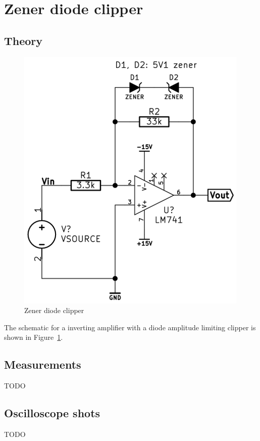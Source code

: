 \documentclass[11pt,a4paper]{article}
\begin{document}
\section{Zener diode clipper}\label{zener-clipper}

\subsection{Theory}\label{clipper-theory}
\begin{figure}[htbp]
    \centering
        \includegraphics[scale=0.5]{img/zenerclipper.png}
    \caption{Zener diode clipper}
    \label{fig:clipper-schem}
\end{figure}

The schematic for a inverting amplifier with a diode amplitude limiting clipper
is shown in Figure~\ref{fig:clipper-schem}.

\subsection{Measurements}\label{clipper-measurements}
TODO

\subsection{Oscilloscope shots}\label{clipper-oscilloscope-shots}
TODO
\end{document}
